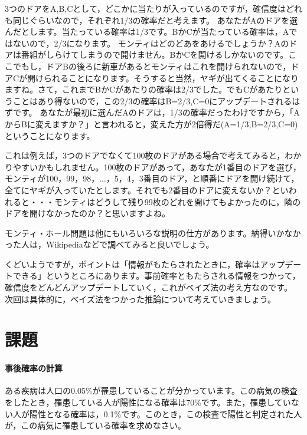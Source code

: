 \documentclass{ltjbook}
\begin{document}
3つのドアをA,B,Cとして，どこかに当たりが入っているのですが，確信度はどれも同じぐらいなので，それぞれ1/3の確率だと考えます。
あなたがAのドアを選んだとします。当たっている確率は1/3です。BかCが当たっている確率は，Aではないので，2/3になります。
モンティはどのどあをあけるでしょうか？Aのドアは番組がしらけてしまうので開けません。BかCを開けるしかないのです。ここでもし，ドアBの後ろに新車があるとモンティはこれを開けられないので，ドアCが開けられることになります。そうすると当然，ヤギが出てくることになりますね。さて，これまでBかCがあたりの確率は2/3でした。でもCがあたりということはあり得ないので，この2/3の確率はB=2/3,C=0にアップデートされるはずです。
あなたが最初に選んだAのドアは，1/3の確率だったわけですから，「AからBに変えますか？」と言われると，変えた方が2倍得だ(A=1/3,B=2/3,C=0)ということになります。

これは例えば，3つのドアでなくて100枚のドアがある場合で考えてみると，わかりやすいかもしれません。100枚のドアがあって，あなたが1番目のドアを選び，モンティが100，99，98，...，5，4，3番目のドア，と順番にドアを開け続けて，全てにヤギが入っていたとします。それでも2番目のドアに変えないか？といわれると・・・モンティはどうして残り99枚のどれを開けてもよかったのに，隣のドアを開けなかったのか？と思いますよね。

モンティ・ホール問題は他にもいろいろな説明の仕方があります。納得いかなかった人は，Wikipediaなどで調べてみると良いでしょう。

くどいようですが，ポイントは「情報がもたらされたときに，確率はアップデートできる」というところにあります。事前確率ともたらされる情報をつかって，確信度をどんどんアップデートしていく，これがベイズ法の考え方なのです。
次回は具体的に，ベイズ法をつかった推論について考えていきましょう。

\section{課題}
\paragraph{事後確率の計算}ある疾病は人口の0.05\%が罹患していることが分かっています。この病気の検査をしたとき，罹患している人が陽性になる確率は70\%です。また，罹患していない人が陽性となる確率は，0.1\%です。このとき，この検査で陽性と判定された人が，この病気に罹患している確率を求めなさい。
\end{document}
